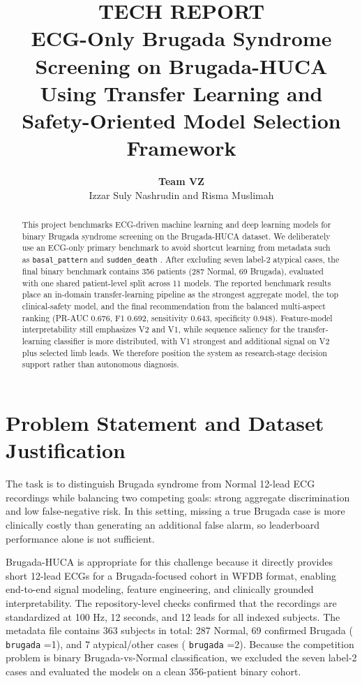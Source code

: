\documentclass[10pt,twocolumn]{article}
\title{\textbf{\Huge TECH REPORT}\\[4pt]
\Large ECG-Only Brugada Syndrome Screening on Brugada-HUCA\\
\Large Using Transfer Learning and\\
\Large Safety-Oriented Model Selection Framework}
\author{\textbf{Team VZ}\\[3pt]Izzar Suly Nashrudin and Risma Muslimah}
\date{}
\let\originaltexttt\texttt
\renewcommand{\texttt}[1]{%
  \begingroup
  \setlength{\fboxsep}{1.2pt}%
  \colorbox{inlinecodebg}{\originaltexttt{#1}}%
  \endgroup
}
\begin{document}
\maketitle

\begin{abstract}
This project benchmarks ECG-driven machine learning and deep learning models for binary Brugada syndrome screening on the Brugada-HUCA dataset. We deliberately use an ECG-only primary benchmark to avoid shortcut learning from metadata such as \texttt{basal\_pattern} and \texttt{sudden\_death}. After excluding seven label-2 atypical cases, the final binary benchmark contains 356 patients (287 Normal, 69 Brugada), evaluated with one shared patient-level split across 11 models. The reported benchmark results place an in-domain transfer-learning pipeline as the strongest aggregate model, the top clinical-safety model, and the final recommendation from the balanced multi-aspect ranking (PR-AUC 0.676, F1 0.692, sensitivity 0.643, specificity 0.948). Feature-model interpretability still emphasizes V2 and V1, while sequence saliency for the transfer-learning classifier is more distributed, with V1 strongest and additional signal on V2 plus selected limb leads. We therefore position the system as research-stage decision support rather than autonomous diagnosis.
\end{abstract}

\section{Problem Statement and Dataset Justification}
The task is to distinguish Brugada syndrome from Normal 12-lead ECG recordings while balancing two competing goals: strong aggregate discrimination and low false-negative risk. In this setting, missing a true Brugada case is more clinically costly than generating an additional false alarm, so leaderboard performance alone is not sufficient.

Brugada-HUCA is appropriate for this challenge because it directly provides short 12-lead ECGs for a Brugada-focused cohort in WFDB format, enabling end-to-end signal modeling, feature engineering, and clinically grounded interpretability. The repository-level checks confirmed that the recordings are standardized at 100 Hz, 12 seconds, and 12 leads for all indexed subjects. The metadata file contains 363 subjects in total: 287 Normal, 69 confirmed Brugada (\texttt{brugada}=1), and 7 atypical/other cases (\texttt{brugada}=2). Because the competition problem is binary Brugada-vs-Normal classification, we excluded the seven label-2 cases and evaluated the models on a clean 356-patient binary cohort.
\end{document}
